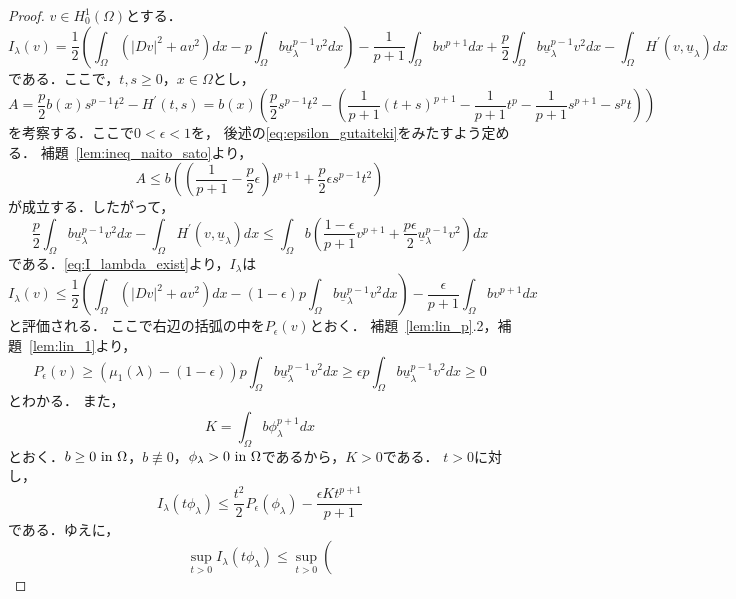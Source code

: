 \begin{proof}
 $v \in H^1_0(\Omega)$とする．
 \begin{equation}
  I_\lambda (v) = \frac{1}{2} \left( \int_\Omega \left( \lvert Dv
                                                  \rvert^2 + a v^2
                                                 \right) dx - p
  \int_\Omega b \underline{u}_\lambda^{p-1} v^2 dx \right) -
  \frac{1}{p+1} \int_\Omega b v^{p+1} dx + \frac{p}{2} \int_\Omega b
  \underline{u}_\lambda ^{p-1} v^2 dx - \int_\Omega H^\prime (v,
  \underline{u}_\lambda) dx \label{eq:I_lambda_exist}
 \end{equation}
 である．ここで，$t, s \geq 0$，$x \in \Omega$とし，
 \[
 A = \frac{p}{2} b(x) s^{p-1} t^2 - H^\prime(t, s) = b(x) \left(
 \frac{p}{2} s^{p-1} t^2 - \left(\frac{1}{p+1} (t+s)^{p+1} -
 \frac{1}{p+1}t^p - \frac{1}{p+1} s^{p+1} - s^p t \right) \right)
 \]
 を考察する．ここで$0 < \epsilon < 1$を，
 後述の\eqref{eq:epsilon_gutaiteki}をみたすよう定める．
 補題~\ref{lem:ineq_naito_sato}より，
 \[
 A \leq b \left( \left( \frac{1}{p+1} - \frac{p}{2} \epsilon \right)
 t^{p+1} + \frac{p}{2}\epsilon s^{p-1} t^2 \right)
 \]
 が成立する．したがって，
 \[
 \frac{p}{2} \int_\Omega b \underline{u}_\lambda^{p-1} v^2 dx -
 \int_\Omega H^\prime (v, \underline{u}_\lambda) dx \leq \int_\Omega b
 \left( \frac{1-\epsilon}{p+1} v^{p+1} + \frac{p \epsilon}{2}
 \underline{u}_\lambda ^{p-1} v^2 \right) dx
 \]
 である．\eqref{eq:I_lambda_exist}より，$I_\lambda$は
 \[
 I_\lambda(v) \leq \frac{1}{2} \left( \int_\Omega \left( \lvert Dv
 \rvert^{2} + a v^2\right)dx - (1 -\epsilon)p \int_\Omega b
 \underline{u}_\lambda^{p-1} v^2 dx \right) - \frac{\epsilon}{p+1}
 \int_\Omega bv^{p+1} dx
\]
 と評価される．
 ここで右辺の括弧の中を$P_\epsilon(v)$とおく．
 補題~\ref{lem:lin_p}.2，補題~\ref{lem:lin_1}より，
 \[
  P_\epsilon(v) \geq \left(\mu_1(\lambda) - (1 - \epsilon) \right) p
 \int_\Omega b
 \underline{u}_\lambda^{p-1} v^2 dx \geq \epsilon p 
 \int_\Omega b
 \underline{u}_\lambda^{p-1} v^2 dx \geq 0
 \]
 とわかる．
 また，
 \begin{equation}
  K = \int_\Omega b \phi_\lambda^{p+1} dx \label{eq:intbphi}
 \end{equation}
 とおく．$b \geq 0 ~\text{in}~ \Omega$，$b \not\equiv 0$，$\phi_\lambda > 0
 ~\text{in}~ \Omega$であるから，$K > 0$である．
 $t > 0$に対し，
 \[
 I_\lambda (t \phi_\lambda) \leq \frac{t^2}{2} P_\epsilon
 (\phi_\lambda) - \frac{\epsilon K t^{p+1}}{p+1}
 \]
 である．ゆえに，
\begin{equation}
 \sup_{t > 0} I_\lambda (t \phi_\lambda) \leq \sup_{t > 0} \left(

\end{equation}
\end{proof}
